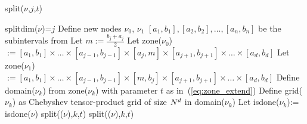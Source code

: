 \begin{algorithm}
\caption{split($\nu$,$j$,$t$)}
\label{alg:split}
\begin{algorithmic}
\STATE \textsf{splitdim}($\nu$)=$j$
\STATE Define new nodes $\nu_0$, $\nu_1$
\STATE $[a_1,b_1],[a_2,b_2],\dots,[a_n,b_n]$ be the subintervals from 
\STATE Let $m:= \frac{b_j+a_j}{2}$
\STATE Let \textsf{zone}($\nu_0$) $:= [a_1,b_1] \times \dots \times [a_{j-1},b_{j-1}] \times [a_{j},m] \times [a_{j+1},b_{j+1}] \times \dots \times [a_{d},b_{d}] $
\STATE Let \textsf{zone}($\nu_1$) $:= [a_1,b_1] \times \dots \times [a_{j-1},b_{j-1}] \times [m,b_{j}] \times [a_{j+1},b_{j+1}] \times \dots \times [a_{d},b_{d}] $
\STATE Define \textsf{domain}($\nu_k$) from \textsf{zone}($\nu_k$) with parameter $t$ as in~(\ref{eq:zone_extend})
\STATE Define \textsf{grid}($\nu_k$) as Chebyshev tensor-product grid of size $N^d$ in \textsf{domain}($\nu_k$)
\STATE Let \textsf{isdone}($\nu_k$):= \textsf{isdone}($\nu$)
\ENDFOR
\ELSE
\STATE split(($\nu$),$k$,$t$)
\STATE split(($\nu$),$k$,$t$)
\ENDIF
\end{algorithmic}
\end{algorithm}



